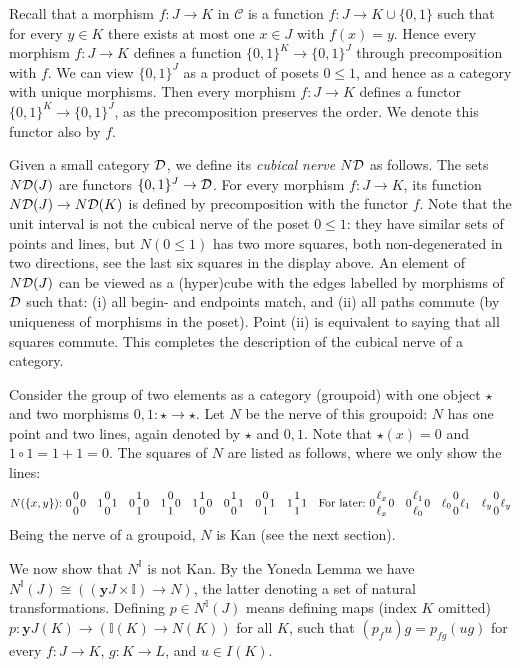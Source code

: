 \documentclass[10pt,a4paper]{article}
\newcommand{\CC}{{\mathcal C}}
\newcommand{\set}[1]{\{#1\}}
\newcommand{\yoneda}{\mathbf{y}}
\newcommand{\interval}{\mathbb{I}}
\newcommand{\DD}{{\cal D}}
\newcommand{\ND}{N\DD}
\begin{document}
Recall that a morphism $f:J\to K$ in $\CC$ is a function $f:J\to
K\cup\set{0,1}$ such that for every $y\in K$ there exists at most one
$x\in J$ with $f(x)=y$.  Hence every morphism $f:J\to K$ defines a
function $\set{0,1}^K \to \set{0,1}^J$ through precomposition with
$f$.  We can view $\set{0,1}^J$ as a product of posets $0\leq1$, and
hence as a category with unique morphisms.  Then every morphism
$f:J\to K$ defines a functor $\set{0,1}^K \to \set{0,1}^J$, as the
precomposition preserves the order.  We denote this functor also by
$f$.

Given a small category $\DD$, we define its \emph{cubical nerve} $\ND$
as follows. The sets $\ND(J)$ are functors $\set{0,1}^J \to\DD$.  For
every morphism $f:J\to K$, its function $\ND(J)\to\ND(K)$ is defined
by precomposition with the functor $f$.  Note that the unit interval
is not the cubical nerve of the poset $0\leq1$: they have similar sets
of points and lines, but $N(0\leq1)$ has two more squares, both
non-degenerated in two directions, see the last six squares in the
display above.  An element of $\ND(J)$ can be viewed as a (hyper)cube
with the edges labelled by morphisms of $\DD$ such that: (i) all
begin- and endpoints match, and (ii) all paths commute (by uniqueness
of morphisms in the poset).  Point (ii) is equivalent to saying that
all squares commute.  This completes the description of the cubical
nerve of a category.

Consider the group of two elements as a category (groupoid) with one
object $\star$ and two morphisms $0,1:\star\to\star$.  Let $N$ be the
nerve of this groupoid: $N$ has one point and two lines, again denoted
by $\star$ and $0,1$.  Note that $\star(x) = 0$ and $1\circ 1 =
1+1=0$.  The squares of $N$ are listed as follows, where we only show
the lines:
\[
\def\ol{{1 \atop 0}}
\def\oo{{0 \atop 0}}
\def\lo{{0 \atop 1}}
\def\ll{{1 \atop 1}}
N(\set{x,y}){:}~
0\oo0 \quad 1\oo1 \quad 0\ll0 \quad 1\lo0 \quad 1\ol0 \quad 0\ol1 \quad 0\lo1 \quad 1\ll1
\quad\mbox{For later:}~0{\ell_x \atop \ell_x}0 \quad 0{\ell_1 \atop \ell_0}0
\quad \ell_0{0 \atop 0}\ell_1 \quad \ell_y{0 \atop 0}\ell_y\]
Being the nerve of a groupoid, $N$ is Kan (see the next section).

We now show that $N^\interval$ is not Kan. By the Yoneda Lemma we have
$N^\interval(J)\cong ((\yoneda J \times \interval) \to N)$, the
latter denoting a set of natural transformations.  
Defining $p\in N^\interval(J)$ means defining maps (index $K$ omitted)
$p :\yoneda J (K) \to (\interval(K) \to N(K))$ for all $K$,
such that $(p_f u) g = p_{fg}(ug)$ 
for every $f:J\to K$, $g:K\to L$, and $u\in I(K)$.
\end{document}
